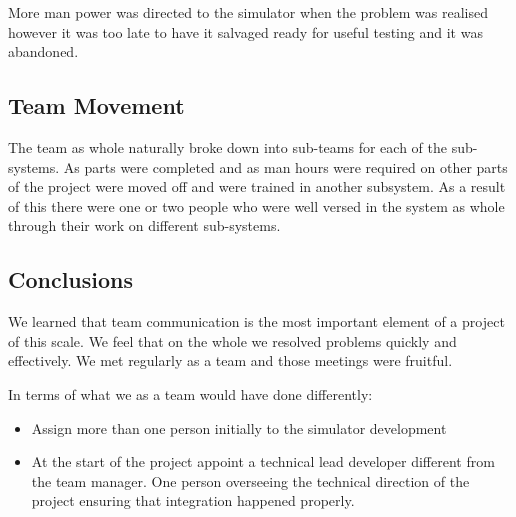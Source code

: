More man power was directed to the simulator when the problem was realised
however it was too late to have it salvaged ready for useful testing and it was
abandoned.

\subsection{Team Movement}

The team as whole naturally broke down into sub-teams for each of the
sub-systems. As parts were completed and as man hours were required on other
parts of the project were moved off and were trained in another subsystem. As
a result of this there were one or two people who were well versed in the
system as whole through their work on different sub-systems.

\subsection{Conclusions}

We learned that team communication is the most important element of a project
of this scale. We feel that on the whole we resolved problems quickly and
effectively. We met regularly as a team and those meetings were fruitful.

In terms of what we as a team would have done differently:
\begin{itemize}
    \item Assign more than one person initially to the simulator development
    \item At the start of the project appoint a technical lead developer 
    different from the team manager. One person overseeing the technical 
    direction of the project ensuring that integration happened properly.
\end{itemize}


